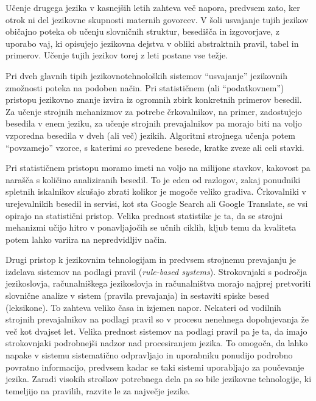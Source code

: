 \begin{multicols}{2}
Učenje drugega jezika v kasnejših letih zahteva več napora, predvsem zato, ker otrok ni del jezikovne skupnosti maternih govorcev. V šoli usvajanje tujih jezikov običajno poteka ob učenju slovničnih struktur, besedišča in izgovorjave, z uporabo vaj, ki opisujejo jezikovna dejstva v obliki abstraktnih pravil, tabel in primerov. Učenje tujih jezikov torej z leti postane vse težje. 

Pri dveh glavnih tipih jezikovnotehnoloških sistemov “usvajanje” jezikovnih zmožnosti poteka na podoben način. Pri statističnem (ali “podatkovnem”) pristopu jezikovno znanje izvira iz ogromnih zbirk konkretnih primerov besedil. Za učenje strojnih mehanizmov za potrebe črkovalnikov, na primer, zadostujejo besedila v enem jeziku, za učenje strojnih prevajalnikov pa morajo biti na voljo vzporedna besedila v dveh (ali več) jezikih. Algoritmi strojnega učenja potem “povzamejo” vzorce, s katerimi so prevedene besede, kratke zveze ali celi stavki.

Pri statističnem pristopu moramo imeti na voljo na milijone stavkov,  kakovost pa narašča s količino analiziranih besedil. To je eden od razlogov, zakaj ponudniki spletnih iskalnikov skušajo zbrati kolikor je mogoče veliko gradiva. Črkovalniki v urejevalnikih besedil in servisi, kot sta Google Search ali Google Translate, se vsi opirajo na statistični pristop. Velika prednost statistike je ta, da se stroj\-ni mehanizmi učijo hitro v ponavljajočih se učnih ciklih, kljub temu da kvaliteta potem lahko variira na nepredvidljiv način.

Drugi pristop k jezikovnim tehnologijam in predvsem strojnemu prevajanju je izdelava sistemov na podlagi pravil (\textit{rule-based systems}). Strokovnjaki s področja jezikoslovja, računalniškega jezikoslovja in računalništva morajo najprej pretvoriti slovnične analize v sistem (pravila prevajanja) in sestaviti spiske besed (leksikone). To zahteva veliko časa in izjemen napor. Nekateri od vodilnih stroj\-nih prevajalnikov na podlagi pravil so v procesu nenehnega dopolnjevanja že več kot dvajset let. Velika prednost sistemov na podlagi pravil pa je ta, da imajo strokovnjaki podrobnejši nadzor nad procesi\-ranjem jezika. To omogoča, da lahko napake v sistemu  sistematično odpravljajo in uporabniku ponudijo podrobno povratno informacijo, predvsem kadar se taki sistemi uporabljajo za poučevanje jezika. Zaradi visokih stroškov potrebnega dela pa so bile jezikovne tehnologije, ki temeljijo na pravilih, razvite le za največje jezike.


\end{multicols}
